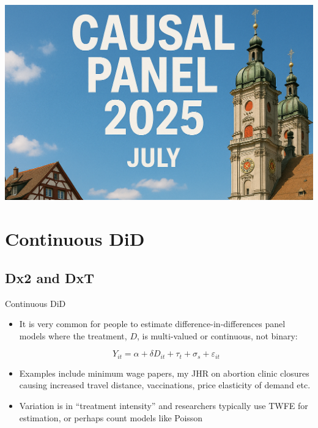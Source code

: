 \documentclass{beamer}
\begin{document}
\begin{frame}[plain]  %
\vfill
\begin{center}
  \includegraphics[width=0.85\linewidth]{./lecture_includes/banner_cropped}
\end{center}
\vfill
\end{frame}




\section{Continuous DiD}

\subsection{Dx2 and DxT}

\begin{frame}{Continuous DiD}

\begin{itemize}
\item It is very common for people to estimate difference-in-differences panel models where the treatment, $D$, is multi-valued or continuous, not binary:

$$Y_{it} = \alpha + \delta D_{it}  + \tau_t + \sigma_s + \varepsilon_{it}$$

\item Examples include minimum wage papers, my JHR on abortion clinic closures causing increased travel distance, vaccinations, price elasticity of demand etc.
\item Variation is in ``treatment intensity'' and researchers typically use TWFE for estimation, or perhaps count models like Poisson

\end{itemize}

\end{frame}
\end{document}
